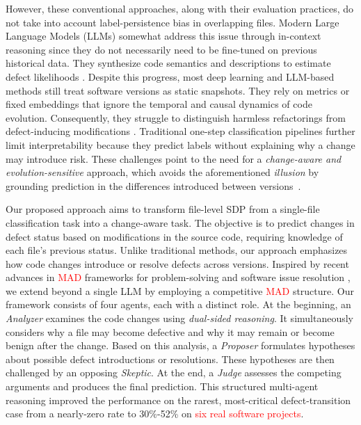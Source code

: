 \documentclass[authoryear,final,5p,times,twocolumn]{elsarticle}
\theoremstyle{plain}
\begin{document}
However, these conventional approaches, along with their evaluation practices, do not take into account label-persistence bias in overlapping files.
Modern Large Language Models (LLMs) somewhat address this issue through in-context reasoning \citep{wei2022chain} since they do not necessarily need to be fine-tuned on previous historical data. They synthesize code semantics and descriptions to estimate defect likelihoods \citep{nam2024using}. Despite this progress, most deep learning and LLM-based methods still treat software versions as static snapshots. They rely on metrics or fixed embeddings that ignore the temporal and causal dynamics of code evolution. Consequently, they struggle to distinguish harmless refactorings from defect-inducing modifications \citep{clinton2025proactive, deeptha2024robust}. Traditional one-step classification pipelines further limit interpretability because they predict labels without explaining why a change may introduce risk. 
These challenges point to the need for a \emph{change-aware and evolution-sensitive} approach, which avoids the aforementioned \textit{illusion} by grounding prediction in the differences introduced between versions~\citep{fakih2025llm4cve, yu2025graphrag, zeng2021deep}. 

Our proposed approach aims to transform file-level SDP from a single-file classification task into a change-aware task. The objective is to predict changes in defect status based on modifications in the source code, requiring knowledge of each file’s previous status. Unlike traditional methods, our approach emphasizes how code changes introduce or resolve defects across versions. Inspired by recent advances in \textcolor{red}{MAD} frameworks for problem-solving and software issue resolution \citep{li2025swe, tillmann2025literature, vamosi2025crawdad}, we extend beyond a single LLM by employing a competitive \textcolor{red}{MAD} structure. 
Our framework consists of four agents, each with a distinct role. At the beginning, an \emph{Analyzer} examines the code changes using \emph{dual-sided reasoning}. It 
simultaneously considers why a file may become defective and why it may remain or become benign after the change. Based on this analysis, a \emph{Proposer} formulates hypotheses about possible defect introductions or resolutions. These hypotheses are then challenged by an opposing \emph{Skeptic}. At the end, a \emph{Judge} assesses the competing arguments and produces the final prediction. This structured multi-agent reasoning improved the performance on the rarest, most-critical defect-transition case from a nearly-zero rate to 30\%-52\% on \textcolor{red}{six real software projects}.
\end{document}
